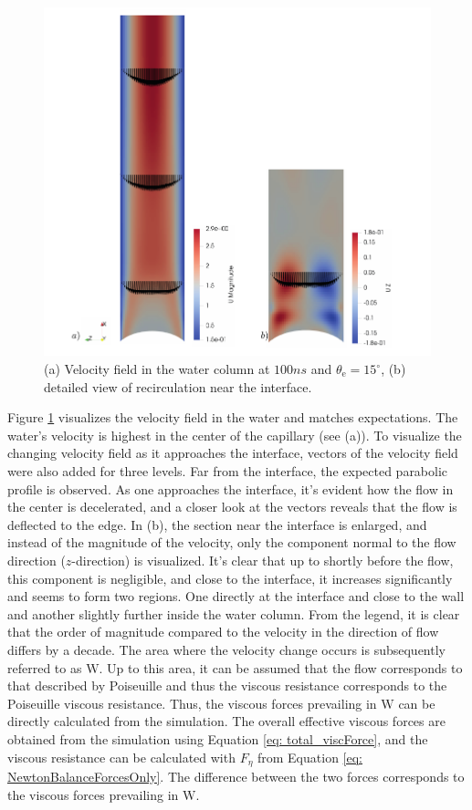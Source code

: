 \begin{figure}[h]
    \centering
    \includegraphics[width=.95\textwidth]{Pictures/Velo_Wedge.pdf}
    \caption{(a) Velocity field in the water column at $100ns$ and $\theta_{\mathrm{e}}=15^{\circ}$, (b) detailed view of recirculation near the interface.}
    \label{fig: Velofield_Wedge}
\end{figure}
Figure \ref{fig: Velofield_Wedge} visualizes the velocity field in the water and matches expectations. The water's velocity is highest in the center of the capillary (see (a)). To visualize the changing velocity field as it approaches the interface, vectors of the velocity field were also added for three levels. Far from the interface, the expected parabolic profile is observed. As one approaches the interface, it's evident how the flow in the center is decelerated, and a closer look at the vectors reveals that the flow is deflected to the edge. In (b), the section near the interface is enlarged, and instead of the magnitude of the velocity, only the component normal to the flow direction ($z$-direction) is visualized. It's clear that up to shortly before the flow, this component is negligible, and close to the interface, it increases significantly and seems to form two regions. One directly at the interface and close to the wall and another slightly further inside the water column. From the legend, it is clear that the order of magnitude compared to the velocity in the direction of flow differs by a decade. The area where the velocity change occurs is subsequently referred to as $\mathrm{W}$. Up to this area, it can be assumed that the flow corresponds to that described by Poiseuille and thus the viscous resistance corresponds to the Poiseuille viscous resistance. Thus, the viscous forces prevailing in $\mathrm{W}$ can be directly calculated from the simulation. The overall effective viscous forces are obtained from the simulation using Equation \ref*{eq: total_viscForce}, and the viscous resistance can be calculated with $F_{\eta}$ from Equation \ref*{eq: NewtonBalanceForcesOnly}. The difference between the two forces corresponds to the viscous forces prevailing in $\mathrm{W}$.

